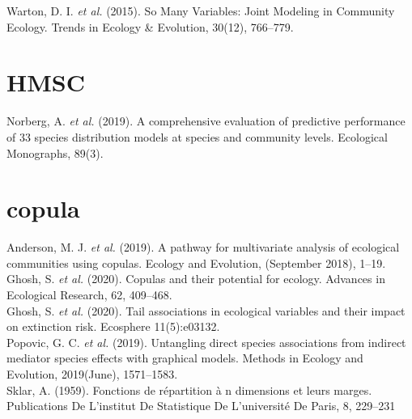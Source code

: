 \documentclass{article}
\begin{document}
Warton, D. I. \textit{et al.} (2015). So Many Variables: Joint Modeling in Community Ecology. Trends in Ecology \& Evolution, 30(12), 766–779. 

\section{HMSC}

Norberg, A. \textit{et al.} (2019). A comprehensive evaluation of predictive performance of 33 species distribution models at species and community levels. Ecological Monographs, 89(3). \

\section{copula}

Anderson, M. J. \textit{et al.} (2019). A pathway for multivariate analysis of ecological communities using copulas. Ecology and Evolution, (September 2018), 1–19.\\

Ghosh, S. \textit{et al.} (2020). Copulas and their potential for ecology. Advances in Ecological Research, 62, 409–468. \\

Ghosh, S. \textit{et al.} (2020). Tail associations in ecological variables and their impact on extinction risk. Ecosphere 11(5):e03132. \\

Popovic, G. C. \textit{et al.} (2019). Untangling direct species associations from indirect mediator species effects with graphical models. Methods in Ecology and Evolution, 2019(June), 1571–1583. \\

Sklar, A. (1959). Fonctions de répartition à n dimensions et leurs marges. Publications De L’institut De Statistique De L’université De Paris, 8, 229–231\\ 

\
\end{document}
